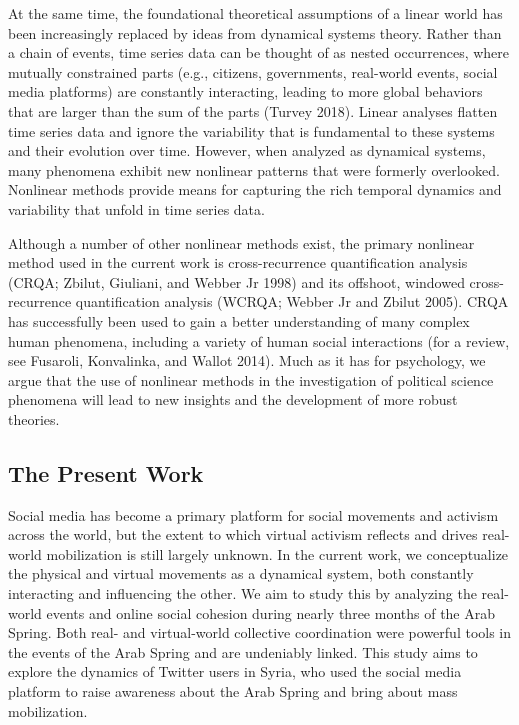 \documentclass[
  english,
  man]{apa6}
\begin{document}
At the same time, the foundational theoretical assumptions of a linear world has
been increasingly replaced by ideas from dynamical systems theory. Rather than a
chain of events, time series data can be thought of as nested occurrences, where
mutually constrained parts (e.g., citizens, governments, real-world events,
social media platforms) are constantly interacting, leading to more global
behaviors that are larger than the sum of the parts (Turvey 2018).
Linear analyses flatten time series data and ignore the variability that is
fundamental to these systems and their evolution over time. However, when
analyzed as dynamical systems, many phenomena exhibit new nonlinear patterns
that were formerly overlooked. Nonlinear methods provide means for capturing the
rich temporal dynamics and variability that unfold in time series data.

Although a number of other nonlinear methods exist, the primary nonlinear method
used in the current work is cross-recurrence quantification analysis (CRQA; Zbilut, Giuliani, and Webber Jr 1998) and its offshoot, windowed cross-recurrence quantification
analysis (WCRQA; Webber Jr and Zbilut 2005). CRQA has successfully been used to gain
a better understanding of many complex human phenomena, including a variety of
human social interactions (for a review, see Fusaroli, Konvalinka, and Wallot 2014). Much as it
has for psychology, we argue that the use of nonlinear methods in the
investigation of political science phenomena will lead to new insights and the
development of more robust theories.

\hypertarget{the-present-work}{%
\subsection{The Present Work}\label{the-present-work}}

Social media has become a primary platform for social movements and activism
across the world, but the extent to which virtual activism reflects and drives
real-world mobilization is still largely unknown. In the current work, we
conceptualize the physical and virtual movements as a dynamical system, both
constantly interacting and influencing the other. We aim to study this by
analyzing the real-world events and online social cohesion during nearly three
months of the Arab Spring. Both real- and virtual-world collective coordination
were powerful tools in the events of the Arab Spring and are undeniably linked.
This study aims to explore the dynamics of Twitter users in Syria, who used the
social media platform to raise awareness about the Arab Spring and bring about
mass mobilization.
\end{document}
